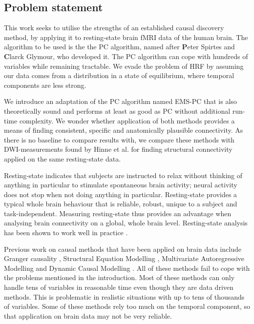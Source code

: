 \documentclass[a4paper, english]{article}
\begin{document}
\subsection{Problem statement}
This work seeks to utilise the strengths of an established causal discovery method, by applying it to resting-state brain fMRI data of the human brain.
The algorithm to be used is the the PC algorithm, named after \textbf{P}eter Spirtes and \textbf{C}larck Glymour, who developed it.
The PC algorithm can cope with hundreds of variables while remaining tractable.
We evade the problem of HRF by assuming our data comes from a distribution in a state of equilibrium, where temporal components are less strong.

We introduce an adaptation of the PC algorithm named EMS-PC that is also theoretically sound and performs at least as good as PC without additional run-time complexity.
We wonder whether application of both methods provides a means of finding consistent, specific and anatomically plausible connectivity.
As there is no baseline to compare results with, we compare these methods with DWI-measurements found by Hinne et al.\cite{hinne2013} for finding structural connectivity applied on the same resting-state data.

Resting-state indicates that subjects are instructed to relax without thinking of anything in particular to stimulate spontaneous brain activity; neural activity does not stop when not doing anything in particular.
Resting-state provides a typical whole brain behaviour that is reliable, robust, unique to a subject and task-independent.
Measuring resting-state thus provides an advantage when analysing brain connectivity on a global, whole brain level.
Resting-state analysis has been shown to work well in practice \cite{Lowe2000, doria2010, Bullmore2009}.

Previous work on causal methods that have been applied on brain data include Granger causality \cite{roebroeck2005}, Structural Equation Modelling \cite{mclntosh1994}, Multivariate Autoregressive Modelling \cite{harrison2003} and Dynamic Causal Modelling \cite{friston2003}.
All of these methods fail to cope with the problems mentioned in the introduction.
Most of these methods can only handle tens of variables in reasonable time even though they are data driven methods.
This is problematic in realistic situations with up to tens of thousands of variables.
Some of these methods rely too much on the temporal component, so that application on brain data may not be very reliable.
\end{document}
